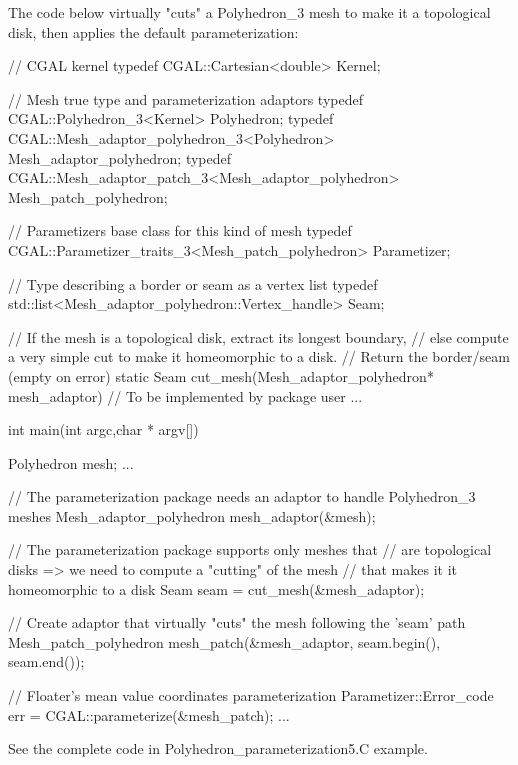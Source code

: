 The code below virtually "cuts" a Polyhedron\_3 mesh to make it a topological disk,
then applies the default parameterization:

\begin{ccExampleCode}

// CGAL kernel
typedef CGAL::Cartesian<double>                             Kernel;

// Mesh true type and parameterization adaptors
typedef CGAL::Polyhedron_3<Kernel>                          Polyhedron;
typedef CGAL::Mesh_adaptor_polyhedron_3<Polyhedron>         Mesh_adaptor_polyhedron;
typedef CGAL::Mesh_adaptor_patch_3<Mesh_adaptor_polyhedron> Mesh_patch_polyhedron;

// Parametizers base class for this kind of mesh
typedef CGAL::Parametizer_traits_3<Mesh_patch_polyhedron>   Parametizer;

// Type describing a border or seam as a vertex list
typedef std::list<Mesh_adaptor_polyhedron::Vertex_handle>   Seam;

// If the mesh is a topological disk, extract its longest boundary,
// else compute a very simple cut to make it homeomorphic to a disk.
// Return the border/seam (empty on error)
static Seam cut_mesh(Mesh_adaptor_polyhedron* mesh_adaptor)
{
    // To be implemented by package user
    ...
}

int main(int argc,char * argv[])
{
    Polyhedron mesh;
    ...

    // The parameterization package needs an adaptor to handle Polyhedron_3 meshes
    Mesh_adaptor_polyhedron mesh_adaptor(&mesh);

    // The parameterization package supports only meshes that
    // are topological disks => we need to compute a "cutting" of the mesh
    // that makes it it homeomorphic to a disk
    Seam seam = cut_mesh(&mesh_adaptor);

    // Create adaptor that virtually "cuts" the mesh following the 'seam' path
    Mesh_patch_polyhedron   mesh_patch(&mesh_adaptor,
                                       seam.begin(),
                                       seam.end());

    // Floater's mean value coordinates parameterization
    Parametizer::Error_code err = CGAL::parameterize(&mesh_patch);
    ...
}

\end{ccExampleCode}

See the complete code in Polyhedron\_parameterization5.C example.


